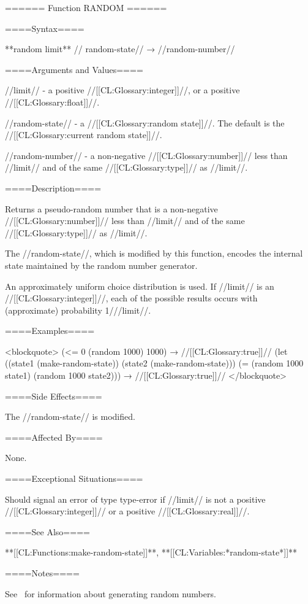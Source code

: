 ====== Function RANDOM ======

====Syntax====

**random {limit** //\opt} random-state// → //random-number//

====Arguments and Values====

//limit// - a positive //[[CL:Glossary:integer]]//, or a positive //[[CL:Glossary:float]]//.

//random-state// - a //[[CL:Glossary:random state]]//. The default is the //[[CL:Glossary:current random state]]//.

//random-number// - a non-negative //[[CL:Glossary:number]]// less than //limit// and of the same //[[CL:Glossary:type]]// as //limit//.

====Description====

Returns a pseudo-random number that is a non-negative //[[CL:Glossary:number]]// less than //limit// and of the same //[[CL:Glossary:type]]// as //limit//.

The //random-state//, which is modified by this function, encodes the internal state maintained by the random number generator.

An approximately uniform choice distribution is used. If //limit// is an //[[CL:Glossary:integer]]//, each of the possible results occurs with (approximate) probability 1///limit//.

====Examples====

<blockquote> (<= 0 (random 1000) 1000) → //[[CL:Glossary:true]]// (let ((state1 (make-random-state)) (state2 (make-random-state))) (= (random 1000 state1) (random 1000 state2))) → //[[CL:Glossary:true]]// </blockquote>

====Side Effects====

The //random-state// is modified.

====Affected By====

None.

====Exceptional Situations====

Should signal an error of type type-error if //limit// is not a positive //[[CL:Glossary:integer]]// or a positive //[[CL:Glossary:real]]//.

====See Also====

**[[CL:Functions:make-random-state]]**, **[[CL:Variables:*random-state*]]**

====Notes====

See \CLtL\ for information about generating random numbers.

